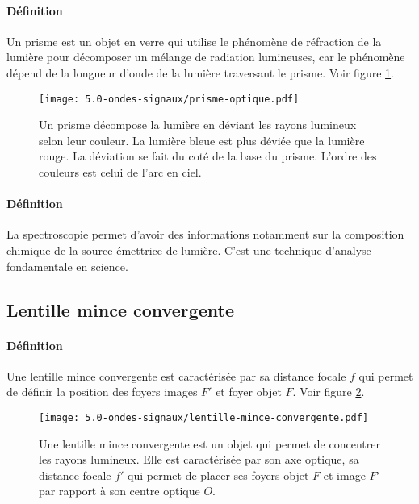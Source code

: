 \paragraph{Définition} Un prisme est un objet en verre qui utilise le phénomène de réfraction de la lumière pour décomposer un mélange de radiation lumineuses, car le phénomène dépend de la longueur d'onde de la lumière traversant le prisme. Voir figure \ref{fig:prisme-optique}.
\begin{figure}[h!]
  \begin{center}
      \texttt{[image: 5.0-ondes-signaux/prisme-optique.pdf]}
  \end{center}
  \caption{Un prisme décompose la lumière en déviant les rayons lumineux selon leur couleur. La lumière bleue est plus déviée que la lumière rouge. La déviation se fait du coté de la base du prisme. L'ordre des couleurs est celui de l'arc en ciel.}
  \label{fig:prisme-optique}
\end{figure}

\paragraph{Définition} La spectroscopie permet d'avoir des informations notamment  sur la composition chimique de la source émettrice de lumière. C'est une technique d'analyse fondamentale en science.



\subsection{Lentille mince convergente}
\paragraph{Définition} Une lentille mince convergente est caractérisée par sa distance focale $f$ qui permet de définir la position des foyers images $F'$ et foyer objet $F$. Voir figure \ref{fig:lentille-mince-convergente}.
\begin{figure}[h!]
  \begin{center}
      \texttt{[image: 5.0-ondes-signaux/lentille-mince-convergente.pdf]}
  \end{center}
  \caption{Une lentille mince convergente est un objet qui permet de concentrer les rayons lumineux. Elle est caractérisée par son axe optique, sa distance focale $f'$ qui permet de placer ses foyers objet $F$ et image $F'$ par rapport à son centre optique $O$.}
  \label{fig:lentille-mince-convergente}
\end{figure}


